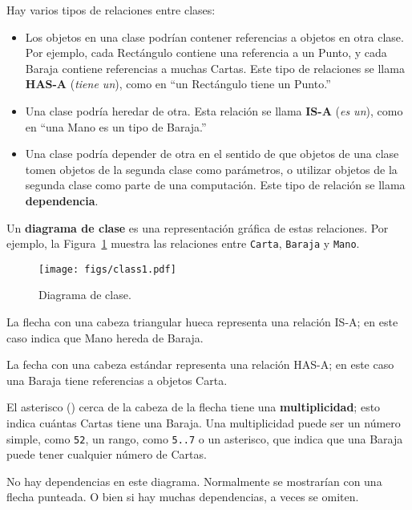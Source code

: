 \documentclass[10pt]{book}
\begin{document}
Hay varios tipos de relaciones entre clases:

\begin{itemize}

\item Los objetos en una clase podrían contener referencias a objetos
en otra clase.  Por ejemplo, cada Rectángulo contiene una referencia
a un Punto, y cada Baraja contiene referencias a muchas Cartas.
Este tipo de relaciones se llama {\bf HAS-A} ({\em tiene un}), como en ``un Rectángulo
tiene un Punto.''

\item Una clase podría heredar de otra.  Esta relación
se llama {\bf IS-A} ({\em es un}), como en ``una Mano es un tipo de Baraja.''

\item Una clase podría depender de otra en el sentido de que objetos
de una clase tomen objetos de la segunda clase como parámetros, o
utilizar objetos de la segunda clase como parte de una computación.  Este
tipo de relación se llama {\bf dependencia}.

\end{itemize}

Un {\bf diagrama de clase} es una representación gráfica de estas
relaciones.  Por ejemplo, la Figura~\ref{fig.class1} muestra las
relaciones entre {\tt Carta}, {\tt Baraja} y {\tt Mano}.

\begin{figure}
\centerline
{\texttt{[image: figs/class1.pdf]}}
\caption{Diagrama de clase.}
\label{fig.class1}
\end{figure}

La flecha con una cabeza triangular hueca representa una relación IS-A;
en este caso indica que Mano hereda
de Baraja.

La fecha con una cabeza estándar representa una relación HAS-A;
en este caso una Baraja tiene referencias a objetos
Carta.

El asterisco ({\tt *}) cerca de la cabeza de la flecha tiene una
{\bf multiplicidad}; esto indica cuántas Cartas tiene una Baraja.
Una multiplicidad puede ser un número simple, como {\tt 52}, un rango,
como {\tt 5..7} o un asterisco, que indica que una Baraja puede
tener cualquier número de Cartas.

No hay dependencias en este diagrama.  Normalmente se
mostrarían con una flecha punteada.  O bien si hay muchas
dependencias, a veces se omiten.
\end{document}

